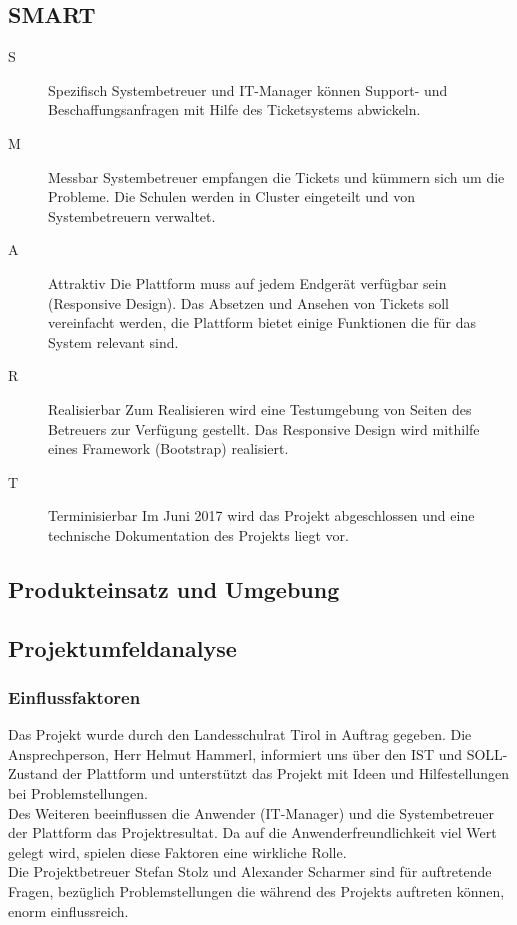 \subsection{SMART}
\begin{description}
	\item[S] Spezifisch\newline
	Systembetreuer und IT-Manager können Support- und Beschaffungsanfragen mit Hilfe des Ticketsystems abwickeln.
	\item[M] Messbar\newline
	Systembetreuer empfangen die Tickets und kümmern sich um die Probleme. Die Schulen werden in Cluster eingeteilt und von Systembetreuern verwaltet. 
	\item[A] Attraktiv\newline
	Die Plattform muss auf jedem Endgerät verfügbar sein (Responsive Design). Das Absetzen und Ansehen von Tickets soll vereinfacht werden, die Plattform bietet einige Funktionen die für das System relevant sind.
	\item[R] Realisierbar\newline
	Zum Realisieren wird eine Testumgebung von Seiten des Betreuers zur Verfügung gestellt. Das Responsive Design wird mithilfe eines Framework (Bootstrap) realisiert.
	\item[T] Terminisierbar\newline
	Im Juni 2017 wird das Projekt abgeschlossen und eine technische Dokumentation des Projekts liegt vor.
\end{description}


\subsection{Produkteinsatz und Umgebung}
\subsection{Projektumfeldanalyse}
\subsubsection{Einflussfaktoren}
Das Projekt wurde durch den Landesschulrat Tirol in Auftrag gegeben. Die Ansprechperson, Herr Helmut Hammerl, informiert uns über den IST und SOLL-Zustand der Plattform und unterstützt das Projekt mit Ideen und Hilfestellungen bei Problemstellungen.
\\
Des Weiteren beeinflussen die Anwender (IT-Manager) und die Systembetreuer der Plattform das Projektresultat. Da auf die Anwenderfreundlichkeit viel Wert gelegt wird, spielen diese Faktoren eine wirkliche Rolle.
\\
Die Projektbetreuer Stefan Stolz und Alexander Scharmer sind für auftretende Fragen, bezüglich Problemstellungen die während des Projekts auftreten können, enorm einflussreich.
\newpage
